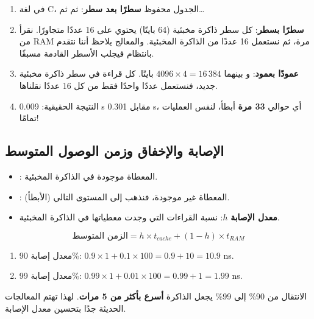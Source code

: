 \begin{khatwa}
    \begin{enumerate}
        \item في لغة \textenglish{C}، الجدول  محفوظ \textbf{سطرًا بعد سطر}:  ثم  ثم\dots
        \item \textbf{سطرًا بسطر}: كل سطر ذاكرة مخبئية (64 بايتًا) يحتوي على 16 عددًا متجاورًا. نقرأ من \textenglish{RAM} مرة، ثم نستعمل
              16 عددًا من الذاكرة المخبئية. والمعالج يلاحظ أننا نتقدم بانتظام فيجلب الأسطر القادمة مسبقًا.
        \item \textbf{عمودًا بعمود}:  و بينهما $4096 \times 4 = 16\,384$ بايتًا. كل قراءة
              في سطر ذاكرة مخبئية جديد، فنستعمل عددًا واحدًا فقط من كل 16 عددًا نقلناها.
        \item النتيجة الحقيقية: \textenglish{0.009 s} مقابل \textenglish{0.301 s}، أي حوالي \textbf{33 مرة} أبطأ،
              لنفس العمليات تمامًا!
    \end{enumerate}
\end{khatwa}

\subsection{الإصابة والإخفاق وزمن الوصول المتوسط}
\begin{tarif}
    \begin{itemize}
        \item {}: المعطاة موجودة في الذاكرة المخبئية.
        \item {}: المعطاة غير موجودة، فنذهب إلى المستوى التالي (الأبطأ).
        \item \textbf{معدل الإصابة} $h$: نسبة القراءات التي وجدت معطياتها في الذاكرة المخبئية.
    \end{itemize}
    \[ \text{الزمن المتوسط} = h \times t_{cache} + (1 - h) \times t_{RAM} \]
\end{tarif}

\begin{khatwa}[: \textenglish{$t_{cache} = 1$ ns}، \textenglish{$t_{RAM} = 100$ ns}]
    \begin{enumerate}
        \item معدل إصابة 90\%: $0.9 \times 1 + 0.1 \times 100 = 0.9 + 10 = 10.9$ \textenglish{ns}.
        \item معدل إصابة 99\%: $0.99 \times 1 + 0.01 \times 100 = 0.99 + 1 = 1.99$ \textenglish{ns}.
    \end{enumerate}
    الانتقال من 90\% إلى 99\% يجعل الذاكرة \textbf{أسرع بأكثر من 5 مرات}. لهذا تهتم المعالجات الحديثة جدًا
    بتحسين معدل الإصابة.
\end{khatwa}

